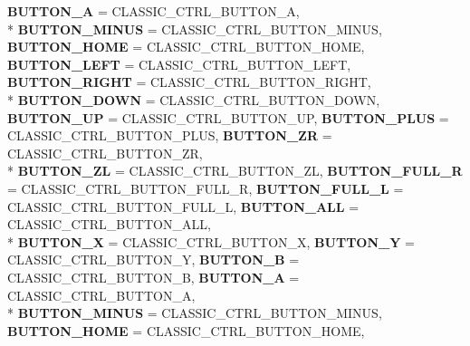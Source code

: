 \begin{DoxyCompactItemize}
{\bfseries B\-U\-T\-T\-O\-N\-\_\-\-A} =  C\-L\-A\-S\-S\-I\-C\-\_\-\-C\-T\-R\-L\-\_\-\-B\-U\-T\-T\-O\-N\-\_\-\-A, 
\\*
{\bfseries B\-U\-T\-T\-O\-N\-\_\-\-M\-I\-N\-U\-S} =  C\-L\-A\-S\-S\-I\-C\-\_\-\-C\-T\-R\-L\-\_\-\-B\-U\-T\-T\-O\-N\-\_\-\-M\-I\-N\-U\-S, 
{\bfseries B\-U\-T\-T\-O\-N\-\_\-\-H\-O\-M\-E} =  C\-L\-A\-S\-S\-I\-C\-\_\-\-C\-T\-R\-L\-\_\-\-B\-U\-T\-T\-O\-N\-\_\-\-H\-O\-M\-E, 
{\bfseries B\-U\-T\-T\-O\-N\-\_\-\-L\-E\-F\-T} =  C\-L\-A\-S\-S\-I\-C\-\_\-\-C\-T\-R\-L\-\_\-\-B\-U\-T\-T\-O\-N\-\_\-\-L\-E\-F\-T, 
{\bfseries B\-U\-T\-T\-O\-N\-\_\-\-R\-I\-G\-H\-T} =  C\-L\-A\-S\-S\-I\-C\-\_\-\-C\-T\-R\-L\-\_\-\-B\-U\-T\-T\-O\-N\-\_\-\-R\-I\-G\-H\-T, 
\\*
{\bfseries B\-U\-T\-T\-O\-N\-\_\-\-D\-O\-W\-N} =  C\-L\-A\-S\-S\-I\-C\-\_\-\-C\-T\-R\-L\-\_\-\-B\-U\-T\-T\-O\-N\-\_\-\-D\-O\-W\-N, 
{\bfseries B\-U\-T\-T\-O\-N\-\_\-\-U\-P} =  C\-L\-A\-S\-S\-I\-C\-\_\-\-C\-T\-R\-L\-\_\-\-B\-U\-T\-T\-O\-N\-\_\-\-U\-P, 
{\bfseries B\-U\-T\-T\-O\-N\-\_\-\-P\-L\-U\-S} =  C\-L\-A\-S\-S\-I\-C\-\_\-\-C\-T\-R\-L\-\_\-\-B\-U\-T\-T\-O\-N\-\_\-\-P\-L\-U\-S, 
{\bfseries B\-U\-T\-T\-O\-N\-\_\-\-Z\-R} =  C\-L\-A\-S\-S\-I\-C\-\_\-\-C\-T\-R\-L\-\_\-\-B\-U\-T\-T\-O\-N\-\_\-\-Z\-R, 
\\*
{\bfseries B\-U\-T\-T\-O\-N\-\_\-\-Z\-L} =  C\-L\-A\-S\-S\-I\-C\-\_\-\-C\-T\-R\-L\-\_\-\-B\-U\-T\-T\-O\-N\-\_\-\-Z\-L, 
{\bfseries B\-U\-T\-T\-O\-N\-\_\-\-F\-U\-L\-L\-\_\-\-R} =  C\-L\-A\-S\-S\-I\-C\-\_\-\-C\-T\-R\-L\-\_\-\-B\-U\-T\-T\-O\-N\-\_\-\-F\-U\-L\-L\-\_\-\-R, 
{\bfseries B\-U\-T\-T\-O\-N\-\_\-\-F\-U\-L\-L\-\_\-\-L} =  C\-L\-A\-S\-S\-I\-C\-\_\-\-C\-T\-R\-L\-\_\-\-B\-U\-T\-T\-O\-N\-\_\-\-F\-U\-L\-L\-\_\-\-L, 
{\bfseries B\-U\-T\-T\-O\-N\-\_\-\-A\-L\-L} =  C\-L\-A\-S\-S\-I\-C\-\_\-\-C\-T\-R\-L\-\_\-\-B\-U\-T\-T\-O\-N\-\_\-\-A\-L\-L, 
\\*
{\bfseries B\-U\-T\-T\-O\-N\-\_\-\-X} =  C\-L\-A\-S\-S\-I\-C\-\_\-\-C\-T\-R\-L\-\_\-\-B\-U\-T\-T\-O\-N\-\_\-\-X, 
{\bfseries B\-U\-T\-T\-O\-N\-\_\-\-Y} =  C\-L\-A\-S\-S\-I\-C\-\_\-\-C\-T\-R\-L\-\_\-\-B\-U\-T\-T\-O\-N\-\_\-\-Y, 
{\bfseries B\-U\-T\-T\-O\-N\-\_\-\-B} =  C\-L\-A\-S\-S\-I\-C\-\_\-\-C\-T\-R\-L\-\_\-\-B\-U\-T\-T\-O\-N\-\_\-\-B, 
{\bfseries B\-U\-T\-T\-O\-N\-\_\-\-A} =  C\-L\-A\-S\-S\-I\-C\-\_\-\-C\-T\-R\-L\-\_\-\-B\-U\-T\-T\-O\-N\-\_\-\-A, 
\\*
{\bfseries B\-U\-T\-T\-O\-N\-\_\-\-M\-I\-N\-U\-S} =  C\-L\-A\-S\-S\-I\-C\-\_\-\-C\-T\-R\-L\-\_\-\-B\-U\-T\-T\-O\-N\-\_\-\-M\-I\-N\-U\-S, 
{\bfseries B\-U\-T\-T\-O\-N\-\_\-\-H\-O\-M\-E} =  C\-L\-A\-S\-S\-I\-C\-\_\-\-C\-T\-R\-L\-\_\-\-B\-U\-T\-T\-O\-N\-\_\-\-H\-O\-M\-E, 

\end{DoxyCompactItemize}
